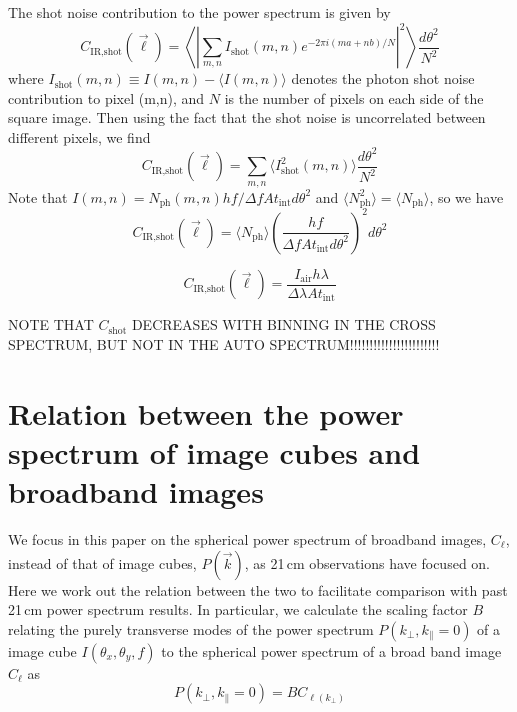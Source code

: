\documentclass[preprint]{aastex}
\newcommand{\IR}{\text{IR}}
\newcommand{\shot}{\text{shot}}
\begin{document}
The shot noise contribution to the power spectrum is given by
\begin{equation}
C_{\IR, \shot}(\vec{\ell}) = \left\langle\left|\sum_{m,n}I_\shot(m,n)e^{-2\pi i(ma+nb)/N}\right|^2\right\rangle \frac{d\theta^2}{N^2}
\end{equation}
where $I_\shot(m,n)\equiv I(m,n)-\langle I(m,n)\rangle$ denotes the photon shot noise contribution to pixel (m,n), and $N$ is the number of pixels on each side of the square image. Then using the fact that the shot noise is uncorrelated between different pixels, we find
\begin{equation}
C_{\IR, \shot}(\vec{\ell}) = \sum_{m,n}\langle I^2_\shot(m,n)\rangle \frac{d\theta^2}{N^2}
\end{equation}
Note that $I(m,n)=N_\text{ph}(m,n)hf/\Delta f A t_\text{int}d\theta^2$ and $\langle N_\text{ph}^2\rangle = \langle N_\text{ph}\rangle$, so we have
\begin{equation}
C_{\IR, \shot}(\vec{\ell}) = \langle N_\text{ph}\rangle \left(\frac{hf}{\Delta f A t_\text{int}d\theta^2}\right)^2 d\theta^2
\end{equation}

\begin{equation}
C_{\IR, \shot}(\vec{\ell}) =\frac{I_\text{air}h\lambda}{\Delta \lambda A t_\text{int}}
\end{equation}

NOTE THAT $C_\shot$ DECREASES WITH BINNING IN THE CROSS SPECTRUM, BUT NOT IN THE AUTO SPECTRUM!!!!!!!!!!!!!!!!!!!!!!!

\section{Relation between the power spectrum of image cubes and broadband images}
\label{sec:pspecrelation}

We focus in this paper on the spherical power spectrum of broadband images, $C_\ell$,  instead of that of image cubes, $P(\vec{k})$, as 21\,cm observations have focused on. Here we work out the relation between the two to facilitate comparison with past 21\,cm power spectrum results. In particular, we calculate the scaling factor $B$ relating the purely transverse modes of the power spectrum $P(k_\perp,k_\parallel=0)$ of a image cube $I(\theta_x,\theta_y,f)$ to the spherical power spectrum of a broad band image $C_\ell$ as
\begin{equation}
P(k_\perp,k_\parallel=0) = B C_{\ell(k_\perp)}
\end{equation}
\end{document}

